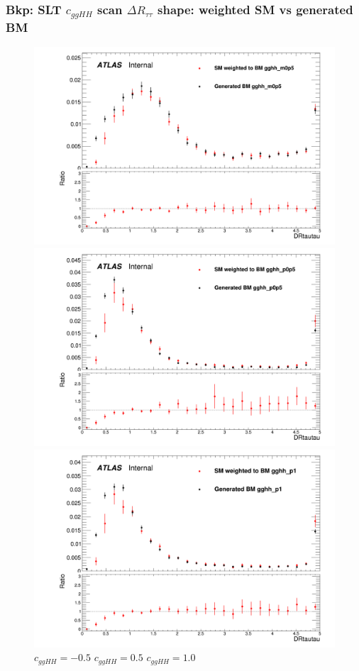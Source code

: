 \documentclass[twoside,11pt]{beamer}
\begin{document}
\begin{frame}
    \frametitle{Bkp: SLT $c_{ggHH}$ scan $\Delta R_{\tau\tau}$ shape: weighted SM vs generated BM}

    \begin{figure}
    \includegraphics[width=.32\textwidth]{figures/Method_B_all_latest/BMgghh_m0p5h_DRtautau.png}
    \includegraphics[width=.32\textwidth]{figures/Method_B_all_latest/BMgghh_p0p5h_DRtautau.png}
    \includegraphics[width=.32\textwidth]{figures/Method_B_all_latest/BMgghh_p1h_DRtautau.png}
    $c_{ggHH} = -0.5$ \hspace{5em} $c_{ggHH} = 0.5$\hspace{5em} $c_{ggHH} = 1.0$
    \end{figure}


\end{frame}     
\end{document}

